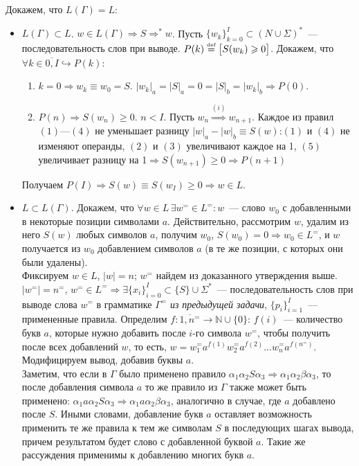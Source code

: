 \documentclass[a4paper]{article}
\def\eqdef{\overset{\mbox{\tiny def}}{=}}
\begin{document}
Докажем, что $L(\Gamma)=L$:\begin{itemize}
\item $L(\Gamma)\subset L$. $w\in L(\Gamma)\Rightarrow S\Longrightarrow^* w$. Пусть $\{w_k\}_{k=0}^I\subset (N\cup \Sigma)^*$~--- последовательность слов при выводе.\newline
$P(k)\eqdef\big[S(w_k)\geqslant 0\big]$. Докажем, что $\forall k\in\overline{0,I}\hookrightarrow P(k)$:\begin{enumerate}[1.]
\item $k=0\Rightarrow w_k\equiv w_0=S$. $|w_k|_a=|S|_a=0=|S|_b=|w_k|_b\Rightarrow P(0)$.
\item $P(n)\Rightarrow S(w_n)\geqslant 0$. $n<I$. Пусть $w_n\overset{(i)}{\Longrightarrow}w_{n+1}$. Каждое из правил $(1)$---$(4)$ не уменьшает разницу $|w|_a-|w|_b\equiv S(w)$:\newline$(1)$ и $(4)$ не изменяют операнды, $(2)$ и $(3)$ увеличивают каждое на 1, $(5)$ увеличивает разницу на 1$\Rightarrow S(w_{n+1})\geqslant 0\Rightarrow P(n+1)$
\end{enumerate}
Получаем $P(I)\Rightarrow S(w)\equiv S(w_I)\geqslant 0\Rightarrow w\in L$.
\item $L\subset L(\Gamma)$. Докажем, что $\forall w\in L\,\exists w^=\in L^=\colon w$~--- слово $w_0$ с добавленными в некоторые позиции символами $a$. Действительно, рассмотрим $w$, удалим из него $S(w)$ любых символов $a$, получим $w_0$, $S(w_0)=0\Rightarrow w_0\in L^=$, и $w$ получается из $w_0$ добавлением символов $a$ (в те же позиции, с которых они были удалены).
\\[5pt]
\def\neqv{n^=}
\def\weqv{w^=}
\def\ieq{^=}
Фиксируем $w\in L$, $|w|=n$; $w^=$ найдем из доказанного утверждения выше. $|w^=|=\neqv$, $w^=\in L^=\Rightarrow \exists \{x_i\}^I_{i=0}\subset\{S\}\cup \Sigma^*$~--- последовательность слов при выводе слова $w^=$ в грамматике $\Gamma^=$ {\em из предыдущей задачи}, $\{p_i\}_{i=1}^I$~--- примененные правила.\newline
Определим $f\colon \overline{1,\neqv}\longrightarrow {\mathbb N}\cup\{0\}$: $f(i)$~--- количество букв $a$, которые нужно добавить после $i$-го символа $\weqv$, чтобы получить после всех добавлений $w$, то есть, $w=\weqv_1a^{f(1)}\weqv_2a^{f(2)}...\weqv_na^{f(\neqv)}$.
\\[5pt]
Модифицируем вывод, добавив буквы $a$.
\\[5pt]
Заметим, что если в $\Gamma$ было применено правило $\alpha_1\alpha_2S\alpha_3\Longrightarrow\alpha_1\alpha_2\beta\alpha_3$, то после добавления символа $a$ то же правило из $\Gamma$ также может быть применено: $\alpha_1a\alpha_2S\alpha_3\Longrightarrow\alpha_1a\alpha_2\beta\alpha_3$, аналогично в случае, где $a$ добавлено после $S$. Иными словами, добавление букв $a$ оставляет возможность применить те же правила к тем же символам $S$ в последующих шагах вывода, причем результатом будет слово с добавленной буквой $a$. Такие же рассуждения применимы к добавлению многих букв $a$.

\end{itemize}
\end{document}
